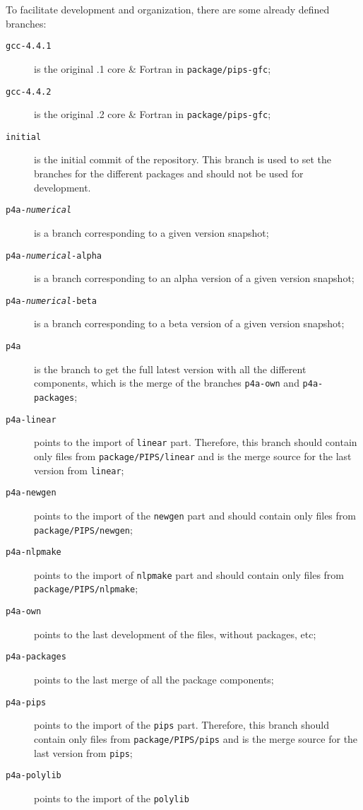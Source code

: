 \documentclass[a4paper]{article}
\begin{document}
To facilitate development and organization, there are some already
defined branches:
\begin{description}
\item[\texttt{gcc-4.4.1}] is the original .1 core \& Fortran in
  \texttt{package/pips-gfc};
\item[\texttt{gcc-4.4.2}] is the original .2 core \& Fortran in
  \texttt{package/pips-gfc};
\item[\texttt{initial}] is the initial commit of the \Apfa
  repository. This branch is used
  to set the branches for the different packages and should not
  be used for development.
\item[\texttt{p4a-\emph{numerical}}] is a branch corresponding to a
  given version snapshot;
\item[\texttt{p4a-\emph{numerical}-alpha}] is a branch corresponding
  to an alpha version of a given version snapshot;
\item[\texttt{p4a-\emph{numerical}-beta}] is a branch corresponding to a beta
  version of a given version snapshot;
\item[\texttt{p4a}] is the branch to get the full latest \Apfa version
  with all the different components, which is the merge of the branches
  \texttt{p4a-own} and \texttt{p4a-packages};
\item[\texttt{p4a-linear}] points to the import of \Apips \texttt{linear}
  part. Therefore, this branch should contain only files from
  \texttt{package/PIPS/linear} and is the merge source for
  the last version from \texttt{linear};
\item[\texttt{p4a-newgen}] points to the import of the \Apips \texttt{newgen}
  part and should contain only files from
  \texttt{package/PIPS/newgen};
\item[\texttt{p4a-nlpmake}] points to the import of \Apips \texttt{nlpmake}
  part and should contain only files from
  \texttt{package/PIPS/nlpmake};
\item[\texttt{p4a-own}] points to the last development of the \Apfa files,
  without packages, etc;
\item[\texttt{p4a-packages}] points to the last merge of all the \Apfa
  package components;
\item[\texttt{p4a-pips}] points to the import of the \Apips \texttt{pips}
  part. Therefore, this branch should contain only files from
  \texttt{package/PIPS/pips} and is the merge source for
  the last version from \texttt{pips};
\item[\texttt{p4a-polylib}] points to the import of the \Apips \texttt{polylib}

\end{description}
\end{document}

